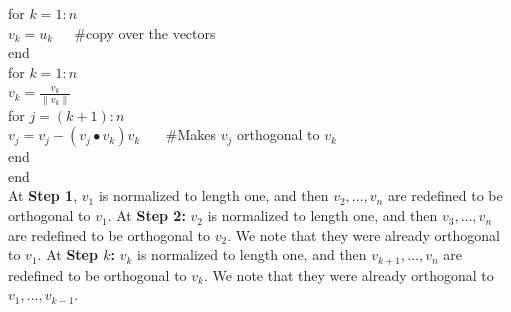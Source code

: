 \begin{tcolorbox}[sharp corners, colback=green!30, colframe=green!80!blue, title=\textbf{\Large Modified Gram-Schmidt has better Numerical Performance}]
 for $k=1:n$\\
        \indent\hspace{4ex}$v_k=u_k$~~~\#copy over the vectors\\
        end \bigskip\\
        for $k=1:n$\\
        \indent\hspace{4ex}$v_k=\frac{v_k}{\|v_k\|}$ \medskip\\
        \indent\hspace{4ex}for $j=(k+1):n$  \medskip\\
        \indent\hspace{8ex}$v_j=v_j-(v_j \bullet v_k)v_k$  ~~~\#Makes $v_j$ orthogonal to  $v_k$\\
        \indent\hspace{4ex}end\\
        end\\ 
        
At \textbf{Step 1}, $v_1$ is normalized to length one, and then $v_2, \ldots, v_n$ are redefined to be orthogonal to $v_1$. At \textbf{Step 2:}  $v_2$ is normalized to length one, and then $v_3, \ldots, v_n$ are redefined to be orthogonal to $v_2$. We note that they were already orthogonal to $v_1$.  At \textbf{Step $k$:}  $v_k$ is normalized to length one, and then $v_{k+1}, \ldots, v_n$ are redefined to be orthogonal to $v_k$. We note that they were already orthogonal to $v_1, \ldots, v_{k-1}$.      
\end{tcolorbox}

\vspace*{.2cm}

